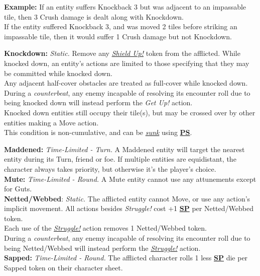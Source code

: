 \documentclass[12pt]{article}
\newcommand{\refto}[1]{\hyperlink{#1}{\textbf{#1}}}
\newcommand{\reftoit}[1]{\hyperlink{#1}{\emph{#1}}}
\begin{document}
\begin{multicols*}{2}
\begin{tcolorbox}
\textbf{Example:} If an entity suffers Knockback 3 but was adjacent to an impassable tile, then 3 Crush damage is dealt along with Knockdown.\\
If the entity suffered Knockback 3, and was moved 2 tiles before striking an impassable tile, then it would suffer 1 Crush damage but not Knockdown.
\end{tcolorbox}

\textbf{Knockdown:} \emph{Static.} Remove any \reftoit{Shield Up!} token from the afflicted. While knocked down, an entity’s actions are limited to those specifying that they may be committed while knocked down.\\
Any adjacent half-cover obstacles are treated as full-cover while knocked down.\\
During a \emph{counterbeat}, any enemy incapable of resolving its encounter roll due to being knocked down will instead perform the \emph{Get Up!} action.\\
Knocked down entities still occupy their tile(s), but may be crossed over by other entities making a Move action.\\
This condition is non-cumulative, and can be \reftoit{sunk} using \refto{PS}.

\textbf{Maddened:} \emph{Time-Limited - Turn.} A Maddened entity will target the nearest entity during its Turn, friend or foe. If multiple entities are equidistant, the character always takes priority, but otherwise it’s the player’s choice.\\

\textbf{Mute:} \emph{Time-Limited - Round.} A Mute entity cannot use any attunements except for Guts.\\

\textbf{Netted/Webbed}: \emph{Static.} The afflicted entity cannot Move, or use any action’s implicit movement. All actions besides \emph{Struggle!} cost +1 \refto{SP} per Netted/Webbed token.\\
Each use of the \reftoit{Struggle!} action removes 1 Netted/Webbed token.\\
During a \emph{counterbeat}, any enemy incapable of resolving its encounter roll due to being Netted/Webbed will instead perform the \reftoit{Struggle!} action.\\

\textbf{Sapped:} \emph{Time-Limited - Round.} The afflicted character rolls 1 less \refto{SP} die per Sapped token on their character sheet.\\


\end{multicols*}
\end{document}
